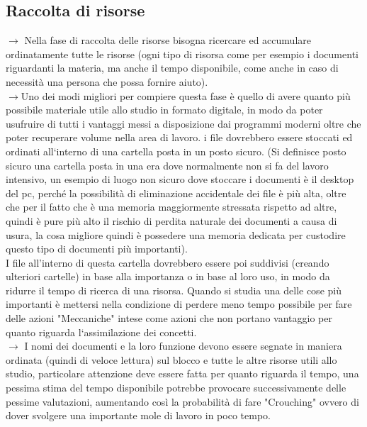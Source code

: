 \documentclass[11pt,a4paper]{article}
\begin{document}
\subsection{Raccolta di risorse}
$\rightarrow$ Nella fase di raccolta delle risorse bisogna ricercare ed accumulare ordinatamente tutte le risorse (ogni tipo di risorsa come per esempio i documenti riguardanti la materia, ma anche il tempo disponibile, come anche in caso di necessità una persona che possa fornire aiuto).\\
$\rightarrow$Uno dei modi migliori per compiere questa fase è quello di avere quanto più possibile materiale utile allo studio in formato digitale, in modo da poter usufruire di tutti i vantaggi messi a disposizione dai programmi moderni oltre che poter recuperare volume nella area di lavoro. i file dovrebbero essere stoccati ed ordinati all`interno di una cartella posta in un posto sicuro. (Si definisce posto sicuro una cartella posta in una era dove normalmente non si fa del lavoro intensivo, un esempio di luogo non sicuro dove stoccare i documenti è il desktop del pc, perché la possibilità di eliminazione accidentale dei file è più alta, oltre che per il fatto che è una memoria maggiormente stressata rispetto ad altre, quindi è pure più alto il rischio di perdita naturale dei documenti a causa di usura, la cosa migliore quindi è possedere una memoria dedicata per custodire questo tipo di documenti più importanti).\\
I file all'interno di questa cartella dovrebbero essere poi suddivisi (creando ulteriori cartelle) in base alla importanza o in base al loro uso, in modo da ridurre il tempo di ricerca di una risorsa. Quando si studia una delle cose più importanti è mettersi nella condizione di perdere meno tempo possibile per fare delle azioni "Meccaniche" intese come azioni che non portano vantaggio per quanto riguarda l`assimilazione dei concetti.\\ 
$\rightarrow$ I nomi dei documenti e la loro funzione devono essere segnate in maniera ordinata (quindi di veloce lettura) sul blocco e tutte le altre risorse utili allo studio, particolare attenzione deve essere fatta per quanto riguarda il tempo, una pessima stima del tempo disponibile potrebbe provocare successivamente delle pessime valutazioni, aumentando così la probabilità di fare "Crouching" ovvero di dover svolgere una importante mole di lavoro in poco tempo.\\
\end{document}
